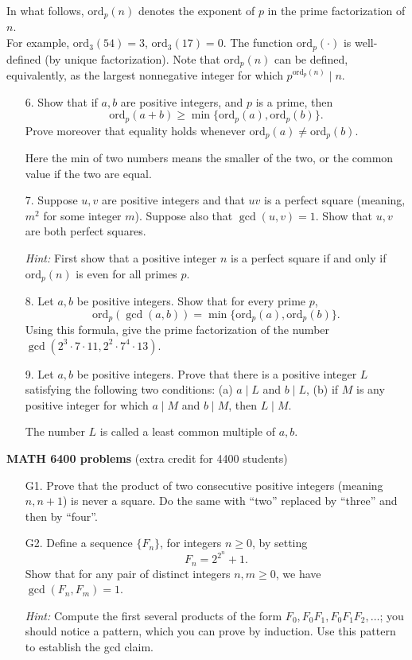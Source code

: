 \documentclass[12pt]{article}
\def\ord{\mathrm{ord}}
\begin{document}
\noindent In what follows, $\ord_p(n)$ denotes the exponent of $p$ in the prime factorization of $n$. \\
For example, \quad $\ord_3(54)=3$, \quad {}\quad $\ord_3(17)=0$.
\vskip 0.1in
\noindent The function $\ord_p(\cdot)$ is well-defined (by unique factorization). Note that $\ord_p(n)$ can be defined, equivalently, as the largest nonnegative integer for which $p^{\ord_p(n)} \mid n$.


\begin{enumerate}
\item[6.] Show that if $a, b$ are positive integers,  and $p$ is a prime, then $$\ord_p(a+b) \ge \min\{\ord_p(a), \ord_p(b)\}.$$ Prove moreover that equality holds whenever $\ord_p(a) \ne \ord_p(b)$.
    
{\scriptsize Here the \textsf{min} of two numbers  means the smaller of the two, or the common value if the two are equal.}

\item[7.] Suppose $u, v$ are positive integers and that $uv$ is a perfect square (meaning, $m^2$ for some integer $m$). Suppose also that $\gcd(u,v)=1$. Show that $u, v$ are both perfect squares.
    
    
{\scriptsize \emph{Hint:} First show that a positive integer $n$ is a perfect square if and only if $\ord_p(n)$ is even for all primes $p$.}

\item[8.] Let $a,b$ be positive integers. Show that for every prime $p$,
\[ \ord_p(\gcd(a,b)) = \min\{\ord_p(a), \ord_p(b)\}. \]
Using this formula, give the prime factorization of the number $\gcd(2^3 \cdot 7 \cdot 11, 2^2 \cdot 7^4 \cdot 13)$.

\item[9.] Let $a, b$ be positive integers. Prove that there is a positive integer $L$ satisfying the following two conditions: (a) $a\mid L$ and $b\mid L$, (b) if $M$ is any positive integer for which $a\mid M$ and $b \mid M$, then $L\mid M$.
    
{\scriptsize The number $L$ is called a \textsf{least common multiple} of $a, b$.}

\end{enumerate}

\noindent\textbf{MATH 6400 problems} (extra credit for 4400 students)
\begin{enumerate}
\item[G1.] Prove that the product of two consecutive positive integers (meaning $n,n+1$) is never a square. Do the same with ``two'' replaced by ``three'' and then by ``four''.

\item[G2.] Define a sequence $\{F_n\}$, for integers $n\ge 0$, by setting
\[ F_n = 2^{2^n}+1.\]
Show that for any pair of distinct integers $n, m\ge 0$, we have $\gcd(F_n,F_m)=1$.

{\scriptsize \emph{Hint:} Compute the first several products of the form $F_0, F_0 F_1, F_0 F_1 F_2, \dots$; you should notice a pattern, which you can prove by induction. Use  this pattern to establish the gcd claim.}
\end{enumerate}
\end{document}
